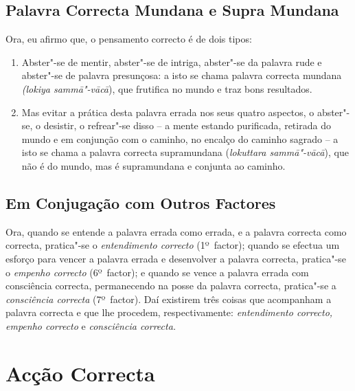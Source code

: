 
\subsection{Palavra Correcta Mundana e Supra Mundana}

Ora, eu afirmo que, o pensamento correcto é de dois tipos:

\begin{enumerate}

  \item Abster"-se de mentir, abster"-se de intriga, abster"-se da palavra rude e
        abster"-se de palavra presunçosa: a isto se chama palavra correcta
        mundana \emph{(lokiya sammā"-vācā}), que frutifica no mundo e traz bons
        resultados.

  \item Mas evitar a prática desta palavra errada nos seus quatro aspectos, o
        abster"-se, o desistir, o refrear"-se disso -- a mente estando purificada,
        retirada do mundo e em conjunção com o caminho, no encalço do caminho
        sagrado -- a isto se chama a palavra correcta supramundana
        (\emph{lokuttara sammā"-vācā}), que não é do mundo, mas é supramundana e
        conjunta ao caminho.

\end{enumerate}

\subsection{Em Conjugação com Outros Factores}

Ora, quando se entende a palavra errada como errada, e a palavra correcta como
correcta, pratica"-se o \emph{entendimento correcto} (1º~factor); quando se
efectua um esforço para vencer a palavra errada e desenvolver a palavra
correcta, pratica"-se o \emph{empenho correcto} (6º~factor); e quando se vence a
palavra errada com consciência correcta, permanecendo na posse da palavra
correcta, pratica"-se a \emph{consciência correcta} (7º~factor). Daí existirem
três coisas que acompanham a palavra correcta e que lhe procedem,
respectivamente: \emph{entendimento correcto, empenho correcto} e
\emph{consciência correcta.}


\section{Acção Correcta}

